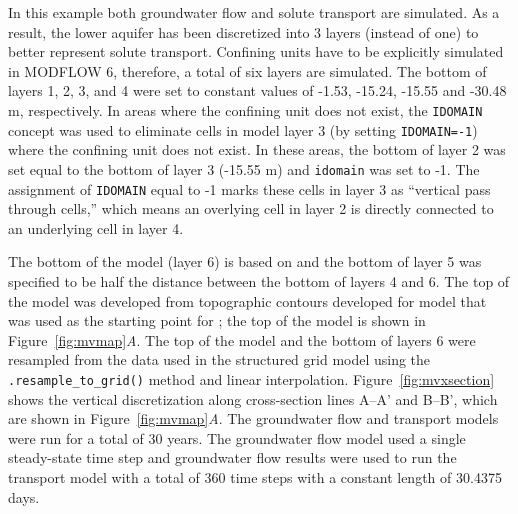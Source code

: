 \documentclass[11pt, oneside]{article}  	%
\begin{document}
In this example both groundwater flow and solute transport are simulated.  As a result, the lower aquifer has been discretized into 3 layers (instead of one) to better represent solute transport. Confining units have to be explicitly simulated in MODFLOW 6, therefore, a total of six layers are simulated. The bottom of layers 1, 2, 3, and 4 were set to constant values of -1.53, -15.24, -15.55 and -30.48 m, respectively. In areas where the confining unit does not exist, the \texttt{IDOMAIN} concept \citep{modflow6gwf} was used to eliminate cells in model layer 3 (by setting \texttt{IDOMAIN=-1}) where the confining unit does not exist. In these areas, the bottom of layer 2 was set equal to the bottom of layer 3 (-15.55 m) and \texttt{idomain} was set to -1.  The assignment of \texttt{IDOMAIN} equal to -1 marks these cells in layer 3 as ``vertical pass through cells,'' which means an overlying cell in layer 2 is directly connected to an underlying cell in layer 4. 

The bottom of the model (layer 6) is based on \cite{hill1998} and the bottom of layer 5 was specified to be half the distance between the bottom of layers 4 and 6. The top of the model was developed from topographic contours developed for model that was used as the starting point for \cite{hill1998} \citep{pollock2014percomm}; the top of the model is shown in Figure~\ref{fig:mvmap}\textit{A}. The top of the model and the bottom of layers 6 were resampled from the data used in the structured grid model using the \texttt{.resample\_to\_grid()} method and linear interpolation.  Figure~\ref{fig:mvxsection} shows the vertical discretization along cross-section lines A--A' and B--B', which are shown in Figure~\ref{fig:mvmap}\textit{A}. The groundwater flow and transport models were run for a total of 30 years. The groundwater flow model used a single steady-state time step and groundwater flow results were used to run the transport model with a total of 360 time steps with a constant length of 30.4375 days.
\end{document}
